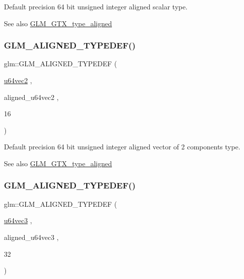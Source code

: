Default precision 64 bit unsigned integer aligned scalar type. \begin{DoxySeeAlso}{See also}
\mbox{\hyperlink{group__gtx__type__aligned}{G\+L\+M\+\_\+\+G\+T\+X\+\_\+type\+\_\+aligned}} 
\end{DoxySeeAlso}
\mbox{\label{group__gtx__type__aligned_ga929427a7627940cdf3304f9c050b677d}} 
\subsubsection{\texorpdfstring{GLM\_ALIGNED\_TYPEDEF()}{GLM\_ALIGNED\_TYPEDEF()}\hspace{0.1cm}{\footnotesize\ttfamily [134/209]}}
{\footnotesize\ttfamily glm\+::\+G\+L\+M\+\_\+\+A\+L\+I\+G\+N\+E\+D\+\_\+\+T\+Y\+P\+E\+D\+EF (\begin{DoxyParamCaption}\item[{\mbox{\hyperlink{group__gtc__type__precision_gaddd85665767e5d32aee8516f00c45f59}{u64vec2}}}]{,  }\item[{aligned\+\_\+u64vec2}]{,  }\item[{16}]{ }\end{DoxyParamCaption})}

Default precision 64 bit unsigned integer aligned vector of 2 components type. \begin{DoxySeeAlso}{See also}
\mbox{\hyperlink{group__gtx__type__aligned}{G\+L\+M\+\_\+\+G\+T\+X\+\_\+type\+\_\+aligned}} 
\end{DoxySeeAlso}
\mbox{\label{group__gtx__type__aligned_gae373b6c04fdf9879f33d63e6949c037e}} 
\subsubsection{\texorpdfstring{GLM\_ALIGNED\_TYPEDEF()}{GLM\_ALIGNED\_TYPEDEF()}\hspace{0.1cm}{\footnotesize\ttfamily [135/209]}}
{\footnotesize\ttfamily glm\+::\+G\+L\+M\+\_\+\+A\+L\+I\+G\+N\+E\+D\+\_\+\+T\+Y\+P\+E\+D\+EF (\begin{DoxyParamCaption}\item[{\mbox{\hyperlink{group__gtc__type__precision_ga7f104c29d70170cfb2223b29f7985bd4}{u64vec3}}}]{,  }\item[{aligned\+\_\+u64vec3}]{,  }\item[{32}]{ }\end{DoxyParamCaption})}

